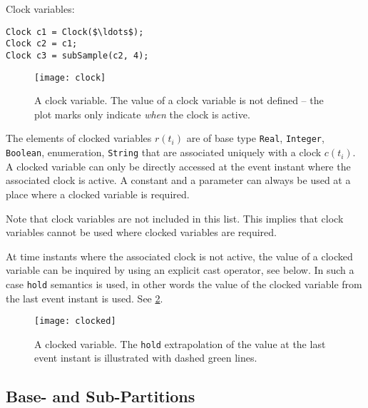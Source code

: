 \begin{example}
Clock variables:
\begin{lstlisting}[language=modelica]
Clock c1 = Clock($\ldots$);
Clock c2 = c1;
Clock c3 = subSample(c2, 4);
\end{lstlisting}
\end{example}

\begin{figure}[H]
  \begin{center}
    \texttt{[image: clock]}
  \end{center}
  \caption{%
    A clock variable.
    The value of a clock variable is not defined -- the plot marks only indicate \emph{when} the clock is active.
  }\label{fig:clock-variable}
\end{figure}

\begin{definition}\label{def:clocked-variable}
The elements of clocked variables $r(t_{i})$ are of base type \lstinline!Real!, \lstinline!Integer!, \lstinline!Boolean!, enumeration, \lstinline!String! that are associated uniquely with a clock $c(t_{i})$.
A clocked variable can only be directly accessed at the event instant where the associated clock is active.
A constant and a parameter can always be used at a place where a clocked variable is required.
\begin{nonnormative}
Note that clock variables are not included in this list.
This implies that clock variables cannot be used where clocked variables are required.
\end{nonnormative}

At time instants where the associated clock is not active, the value of a clocked variable can be inquired by using an explicit cast operator, see below.
In such a case \lstinline!hold! semantics is used, in other words the value of the clocked variable from the last event instant is used.
See \cref{fig:clocked-variable}.
\end{definition}

\begin{figure}[H]
  \begin{center}
    \texttt{[image: clocked]}
  \end{center}
  \caption{
    A clocked variable.
    The \lstinline!hold! extrapolation of the value at the last event instant is illustrated with dashed green lines.
  }\label{fig:clocked-variable}
\end{figure}

\subsection{Base- and Sub-Partitions}\label{base-clock-and-sub-clock-partitions}

